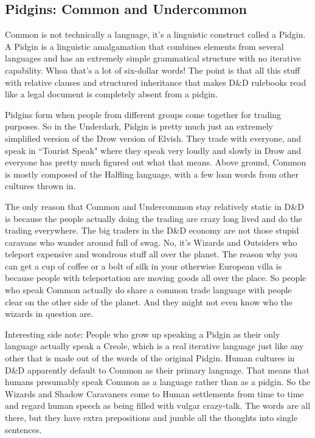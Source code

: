 \subsection{Pidgins: Common and Undercommon}
\vspace*{-8pt}

Common is not technically a language, it's a linguistic construct called a Pidgin. A Pidgin is a linguistic amalgamation that combines elements from several languages and has an extremely simple grammatical structure with no iterative capability. Whoa that's a lot of six-dollar words! The point is that all this stuff with relative clauses and structured inheritance that makes D\&D rulebooks read like a legal document is completely absent from a pidgin.

Pidgins form when people from different groups come together for trading purposes. So in the Underdark, Pidgin is pretty much just an extremely simplified version of the Drow version of Elvish. They trade with everyone, and speak in ``Tourist Speak" where they speak very loudly and slowly in Drow and everyone has pretty much figured out what that means. Above ground, Common is mostly composed of the Halfling language, with a few loan words from other cultures thrown in.

The only reason that Common and Undercommon stay relatively static in D\&D is because the people actually doing the trading are crazy long lived and do the trading everywhere. The big traders in the D\&D economy are not those stupid caravans who wander around full of swag. No, it's Wizards and Outsiders who teleport expensive and wondrous stuff all over the planet. The reason why you can get a cup of coffee or a bolt of silk in your otherwise European villa is because people with teleportation are moving goods all over the place. So people who speak Common actually do share a common trade language with people clear on the other side of the planet. And they might not even know who the wizards in question are.

Interesting side note: People who grow up speaking a Pidgin as their only language actually speak a Creole, which is a real iterative language just like any other that is made out of the words of the original Pidgin. Human cultures in D\&D apparently default to Common as their primary language. That means that humans presumably speak Common as a language rather than as a pidgin. So the Wizards and Shadow Caravaners come to Human settlements from time to time and regard human speech as being filled with vulgar crazy-talk. The words are all there, but they have extra prepositions and jumble all the thoughts into single sentences.

